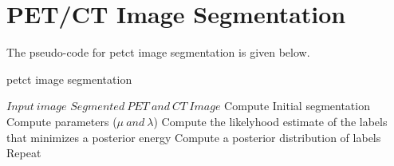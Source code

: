 \section{PET/CT Image Segmentation}

The pseudo-code for \gls{petct} image segmentation is given below.

\begin{algorithm}
	\caption{\gls{petct} image segmentation }\label{alg:pattern}
	\begin{algorithmic}[1]
		\Require $Input\ image$
		\Ensure $Segmented \ PET \ and \ CT \ Image$
		\State Compute Initial segmentation 
			\State Compute parameters ($\mu \ and \ \lambda$) 
			\State Compute the likelyhood estimate of the labels that minimizes a posterior energy
			\State Compute a posterior distribution of labels
			\State Repeat
		\EndFor 
		
		\EndProcedure
	\end{algorithmic}
\end{algorithm}

